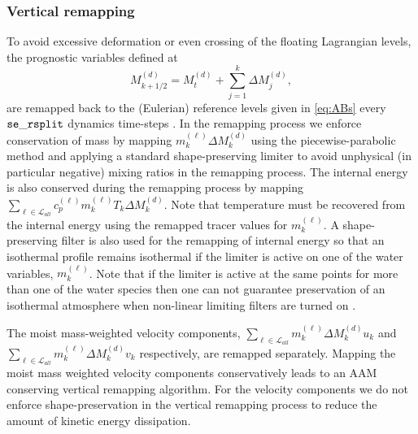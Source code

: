 \documentclass{agujournal}
\begin{document}
{\subsubsection{Vertical remapping}\label{sec:verticalRemappin}
To avoid excessive deformation or even crossing of the floating Lagrangian levels, the prognostic variables defined at
\begin{equation}
M^{(d)}_{k+1/2}=M^{(d)}_t+\sum_{j=1}^{k}\Delta M^{(d)}_j,
\end{equation}
are remapped back to the (Eulerian) reference levels given in \eqref{eq:ABs} every ${\tt{se\_rsplit}}$ dynamics time-steps \citep{L2004MWR}. In the remapping process we enforce conservation of mass by mapping $m^{(\ell)}_k\Delta M^{(d)}_k$ using the piecewise-parabolic method \cite[PPM; ][]{CW1984JCP} and applying a standard shape-preserving limiter to avoid unphysical (in particular negative) mixing ratios in the remapping process. The internal energy is also conserved during the remapping process by mapping $\sum_{\ell \in \mathcal{L}_{all}} c_p^{(\ell)} m_k^{(\ell)}T_k \Delta M^{(d)}_k$. Note that temperature must be recovered from the internal energy using the remapped tracer values for $m^{(\ell)}_k$. A shape-preserving filter is also used for the remapping of internal energy so that an isothermal profile remains isothermal if the limiter is active on one of the water variables, $m^{(\ell)}_k$. Note that if the limiter is active at the same points for more than one of the water species then one can not guarantee preservation of an isothermal atmosphere when non-linear limiting filters are turned on \citep[see, e.g., Section 2.5 in ][]{LT2011QJR}.

The moist mass-weighted velocity components, $\sum_{\ell \in \mathcal{L}_{all}} m^{(\ell)}_k \Delta M^{(d)}_k u_k$ and $\sum_{\ell \in \mathcal{L}_{all}} m_k^{(\ell)} \Delta M^{(d)}_k v_k$ respectively, are remapped separately. Mapping the moist mass weighted velocity components conservatively leads to an AAM conserving vertical remapping algorithm. For the velocity components we do not enforce shape-preservation in the vertical remapping process to reduce the amount of kinetic energy dissipation.
}
\end{document}
